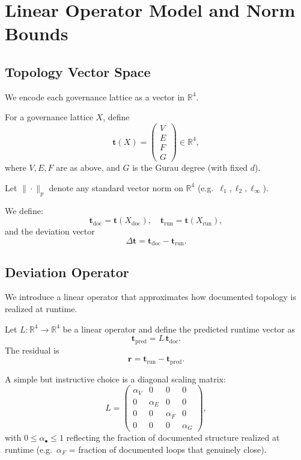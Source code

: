 \documentclass[11pt]{article}
\begin{document}
\section{Linear Operator Model and Norm Bounds}

\subsection{Topology Vector Space}

We encode each governance lattice as a vector in \(\mathbb{R}^4\).

\begin{definition}
For a governance lattice \(X\), define
\[
\mathbf{t}(X) =
\begin{pmatrix}
V\\
E\\
F\\
G
\end{pmatrix}
\in \mathbb{R}^4,
\]
where \(V,E,F\) are as above, and \(G\) is the Gurau degree (with fixed \(d\)).
\end{definition}

Let \(\|\cdot\|_p\) denote any standard vector norm on \(\mathbb{R}^4\) (e.g.\ \(\ell_1,\ell_2,\ell_\infty\)).

We define:
\[
\mathbf{t}_{\mathrm{doc}} = \mathbf{t}(X_{\mathrm{doc}}),\quad
\mathbf{t}_{\mathrm{run}} = \mathbf{t}(X_{\mathrm{run}}),
\]
and the deviation vector
\[
\Delta \mathbf{t} = \mathbf{t}_{\mathrm{doc}} - \mathbf{t}_{\mathrm{run}}.
\]

\subsection{Deviation Operator}

We introduce a linear operator that approximates how documented topology is realized at runtime.

\begin{definition}
Let \(L:\mathbb{R}^4 \to \mathbb{R}^4\) be a linear operator and define the predicted runtime vector as
\[
\mathbf{t}_{\mathrm{pred}} = L\,\mathbf{t}_{\mathrm{doc}}.
\]
The residual is
\[
\mathbf{r} = \mathbf{t}_{\mathrm{run}} - \mathbf{t}_{\mathrm{pred}}.
\]
\end{definition}

A simple but instructive choice is a diagonal scaling matrix:
\[
L =
\begin{pmatrix}
\alpha_V & 0 & 0 & 0\\
0 & \alpha_E & 0 & 0\\
0 & 0 & \alpha_F & 0\\
0 & 0 & 0 & \alpha_G
\end{pmatrix},
\]
with \(0 \le \alpha_\bullet \le 1\) reflecting the fraction of documented structure realized at runtime (e.g.\ \(\alpha_F\) = fraction of documented loops that genuinely close).
\end{document}
